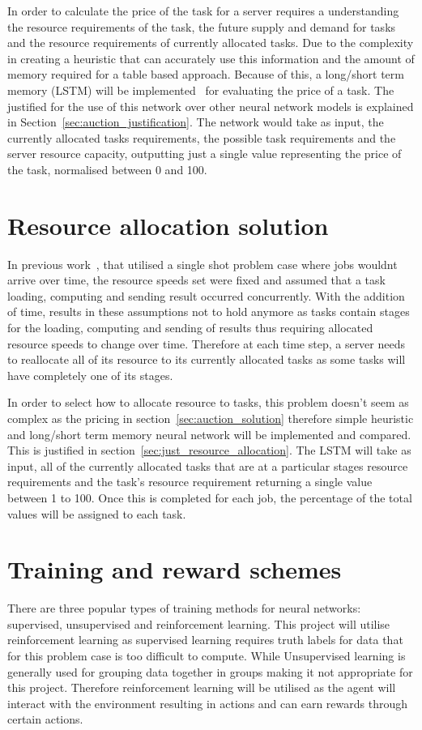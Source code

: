 In order to calculate the price of the task for a server requires a understanding the resource requirements of the task,
the future supply and demand for tasks and the resource requirements of currently allocated tasks. Due to the complexity
in creating a heuristic that can accurately use this information and the amount of memory required for a table based
approach. Because of this, a long/short term memory (LSTM) will be implemented~\citep{LSTM}  for evaluating the price
of a task. The justified for the use of this network over other neural network models is explained in
Section~\ref{sec:auction_justification}. The network would take as input, the currently
allocated tasks requirements, the possible task requirements and the server resource capacity, outputting just a single
value representing the price of the task, normalised between 0 and 100.

\section{Resource allocation solution}\label{sec:resource_allocation}
In previous work~\citep{FlexibleResourceAllocation}, that utilised a single shot problem case where jobs wouldnt arrive
over time, the resource speeds set were fixed and assumed that a task loading, computing and sending result
occurred concurrently. With the addition of time, results in these assumptions not to hold anymore as tasks contain
stages for the loading, computing and sending of results thus requiring allocated resource speeds to change over time.
Therefore at each time step, a server needs to reallocate all of its resource to its currently allocated tasks as
some tasks will have completely one of its stages.

In order to select how to allocate resource to tasks, this problem doesn't seem as complex as the pricing in
section~\ref{sec:auction_solution} therefore simple heuristic and long/short term memory neural network will be
implemented and compared. This is justified in section~\ref{sec:just_resource_allocation}. The LSTM will take as input, all of
the currently allocated tasks that are at a particular stages resource requirements and the task's resource requirement
returning a single value between 1 to 100. Once this is completed for each job, the percentage of the total values will
be assigned to each task.

\section{Training and reward schemes}
There are three popular types of training methods for neural networks: supervised, unsupervised and reinforcement learning.
This project will utilise reinforcement learning as supervised learning requires truth labels for data that for this problem
case is too difficult to compute. While Unsupervised learning is generally used for grouping data together in groups
making it not appropriate for this project. Therefore reinforcement learning will be utilised as the agent will interact
with the environment resulting in actions and can earn rewards through certain actions.

